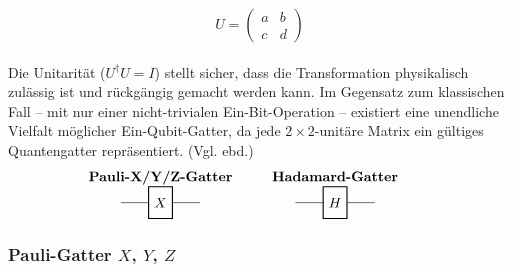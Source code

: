 \begin{equation}\label{equq:unitaets}
U = \begin{pmatrix}
a & b \\
c & d
\end{pmatrix}
\end{equation}
\\
Die Unitarität ($U^{\dagger}U = I$) stellt sicher, dass die Transformation physikalisch zulässig ist und rückgängig gemacht werden kann. Im Gegensatz zum klassischen Fall – mit nur einer nicht-trivialen Ein-Bit-Operation – existiert eine unendliche Vielfalt möglicher Ein-Qubit-Gatter, da jede $2\times 2$-unitäre Matrix ein gültiges Quantengatter repräsentiert. (Vgl. ebd.)\\





\newcommand{\gatterbox}[1]{%
  \tikz[baseline=-0.5ex]{
    \draw[-] (-1,0) -- (-0.3,0);
    \draw[thick] (-0.3,-0.4) rectangle (0.3,0.4);
    \node at (0,0) {\( #1 \)};
    \draw[-] (0.3,0) -- (1,0);
  }%
}
\[
\begin{array}{c@{\hspace{1cm}}c@{\hspace{1cm}}c}
\textbf{Pauli-X/Y/Z-Gatter} & \textbf{Hadamard-Gatter}\\
\gatterbox{X} & \gatterbox{H} 
\end{array}
\]


\subsubsection{Pauli-Gatter $X$, $Y$, $Z$}\label{subsec:pauli_gatter}

